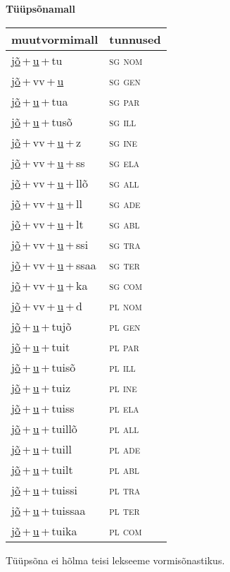 
\vspace{1.8em}
\begin{minipage}{\textwidth}
\textbf{Tüüpsõnamall \,}\\

\begin{sideways}
\begin{tabular}{l l}
muutvormimall & tunnused \\
\hline
\underline{jõ}\,+\,\underline{u}\,+\,tu & \textsc{ sg nom } \\
\underline{jõ}\,+\,vv\,+\,\underline{u} & \textsc{ sg gen } \\
\underline{jõ}\,+\,\underline{u}\,+\,tua & \textsc{ sg par } \\
\underline{jõ}\,+\,\underline{u}\,+\,tusõ & \textsc{ sg ill } \\
\underline{jõ}\,+\,vv\,+\,\underline{u}\,+\,z & \textsc{ sg ine } \\
\underline{jõ}\,+\,vv\,+\,\underline{u}\,+\,ss & \textsc{ sg ela } \\
\underline{jõ}\,+\,vv\,+\,\underline{u}\,+\,llõ & \textsc{ sg all } \\
\underline{jõ}\,+\,vv\,+\,\underline{u}\,+\,ll & \textsc{ sg ade } \\
\underline{jõ}\,+\,vv\,+\,\underline{u}\,+\,lt & \textsc{ sg abl } \\
\underline{jõ}\,+\,vv\,+\,\underline{u}\,+\,ssi & \textsc{ sg tra } \\
\underline{jõ}\,+\,vv\,+\,\underline{u}\,+\,ssaa & \textsc{ sg ter } \\
\underline{jõ}\,+\,vv\,+\,\underline{u}\,+\,ka & \textsc{ sg com } \\
\underline{jõ}\,+\,vv\,+\,\underline{u}\,+\,d & \textsc{ pl nom } \\
\underline{jõ}\,+\,\underline{u}\,+\,tujõ & \textsc{ pl gen } \\
\underline{jõ}\,+\,\underline{u}\,+\,tuit & \textsc{ pl par } \\
\underline{jõ}\,+\,\underline{u}\,+\,tuisõ & \textsc{ pl ill } \\
\underline{jõ}\,+\,\underline{u}\,+\,tuiz & \textsc{ pl ine } \\
\underline{jõ}\,+\,\underline{u}\,+\,tuiss & \textsc{ pl ela } \\
\underline{jõ}\,+\,\underline{u}\,+\,tuillõ & \textsc{ pl all } \\
\underline{jõ}\,+\,\underline{u}\,+\,tuill & \textsc{ pl ade } \\
\underline{jõ}\,+\,\underline{u}\,+\,tuilt & \textsc{ pl abl } \\
\underline{jõ}\,+\,\underline{u}\,+\,tuissi & \textsc{ pl tra } \\
\underline{jõ}\,+\,\underline{u}\,+\,tuissaa & \textsc{ pl ter } \\
\underline{jõ}\,+\,\underline{u}\,+\,tuika & \textsc{ pl com } \\
\end{tabular}
\end{sideways}
\label{tab:tüüpsõnamall-jõutu}

\end{minipage}

 
\vspace{1em}
\noindent Tüüpsõna ei hõlma teisi lekseeme vormi\-sõnastikus.
